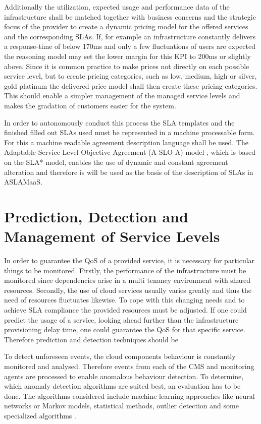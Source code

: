 Additionally the utilization, expected usage and performance data of the infrastructure shall be matched together with business concerns and the strategic focus of the provider to create a dynamic pricing model for the offered services and the corresponding SLAs. If, for example an infrastructure constantly delivers a response-time of below 170ms and only a few fluctuations of users are expected the reasoning model may set the lower margin for this KPI to 200ms or slightly above. Since it is common practice to make prices not directly on each possible service level, but to create pricing categories, such as low, medium, high or silver, gold platinum the delivered price model shall then create these pricing categories. This should enable a simpler management of the managed service levels and makes the gradation of customers easier for the system.
  
In order to autonomously conduct this process the SLA templates and the finished filled out SLAs used must be represented in a machine processable form. For this a machine readable agreement description language shall be used. The Adaptable Service Level Objective Agreement (A-SLO-A) model \cite{A-SLO-A}, which is based on the SLA* model, enables the use of dynamic and constant agreement alteration and therefore is will be used as the basis of the description of SLAs in ASLAMaaS.


\section{Prediction, Detection and Management of Service Levels} \label{SLA prediction}
In order to guarantee the QoS of a provided service, it is necessary for particular things to be monitored. Firstly, the performance of the infrastructure must be monitored since dependencies arise in a multi tenancy environment with shared resources. Secondly, the use of cloud services usually varies greatly and thus the need of resources fluctuates likewise. To cope with this changing needs and to achieve SLA  compliance the provided resources must be adjusted. If one could predict the usage of a service, looking ahead further than the infrastructure provisioning delay time, one could guarantee the QoS for that specific service. Therefore prediction and detection techniques should be 

To detect unforeseen events, the cloud components behaviour is constantly monitored and analysed. Therefore events from each of the CMS and monitoring agents are processed to enable anomalous behaviour detection. 
To determine, which anomaly detection algorithms are suited best, an evaluation has to be done. The algorithms considered include machine learning approaches like neural networks or Markov models, statistical methods, outlier detection and some specialized algorithms \cite{Anomaly2}. %

